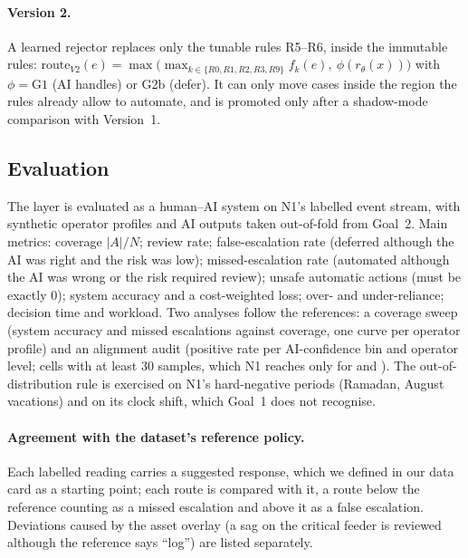 \paragraph{Version 2.} A learned rejector replaces only the tunable rules R5--R6, inside the immutable rules:
$\mathrm{route}_{V2}(e)=\max\bigl(\max_{k\in\{R0,R1,R2,R3,R9\}}f_k(e),\ \phi(r_\theta(x))\bigr)$ with
$\phi=\mathrm{G1}$ (AI handles) or G2b (defer). It can only move cases inside the region the rules already allow to
automate, and is promoted only after a shadow-mode comparison with Version~1.

\subsection{Evaluation}
The layer is evaluated as a human--AI system on N1's labelled event stream, with synthetic operator profiles and
AI outputs taken out-of-fold from Goal~2. Main metrics: coverage $|A|/N$; review rate; false-escalation rate
(deferred although the AI was right and the risk was low); missed-escalation rate (automated although the AI was
wrong or the risk required review); unsafe automatic actions (must be exactly 0); system accuracy and a
cost-weighted loss; over- and under-reliance; decision time and workload. Two analyses follow the references: a
coverage sweep (system accuracy and missed escalations against coverage, one curve per operator profile) and an
alignment audit (positive rate per AI-confidence bin and operator level; cells with at least 30 samples, which N1
reaches only for \GE{} and \MF). The out-of-distribution rule is exercised on N1's hard-negative periods
(Ramadan, August vacations) and on its clock shift, which Goal~1 does not recognise.

\paragraph{Agreement with the dataset's reference policy.} Each labelled reading carries a suggested response,
which we defined in our data card as a starting point; each route is compared with it, a route below the reference
counting as a missed escalation and above it as a false escalation. Deviations caused by the asset overlay (a sag
on the critical feeder is reviewed although the reference says ``log'') are listed separately.


